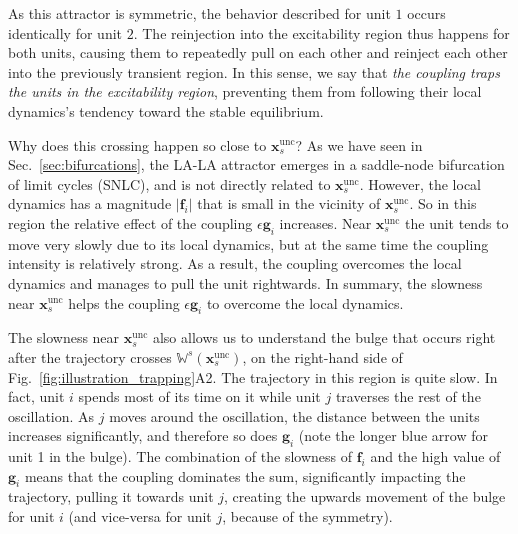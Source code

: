 As this attractor is symmetric, the behavior described for unit $1$ occurs identically for unit $2$. The reinjection into the excitability region thus happens for both units, causing them to repeatedly pull on each other and reinject each other into the previously transient region. In this sense, we say that \textit{the coupling traps the units in the excitability region}, preventing them from following their local dynamics's tendency toward the stable equilibrium.

Why does this crossing happen so close to $\mathbf{x}_s^\mathrm{unc}$? As we have seen in Sec.~\ref{sec:bifurcations}, the LA-LA attractor emerges in a saddle-node bifurcation of limit cycles (SNLC), and is not directly related to $\mathbf{x}_s^\mathrm{unc}$. However, the local dynamics has a magnitude $|\mathbf{f}_i|$ that is small in the vicinity of $\mathbf{x}_s^\mathrm{unc}$. So in this region the relative effect of the coupling $\epsilon \mathbf{g}_i$ increases. Near $\mathbf{x}_s^\mathrm{unc}$ the unit tends to move very slowly due to its local dynamics, but at the same time the coupling intensity is relatively strong. As a result, the coupling overcomes the local dynamics and manages to pull the unit rightwards. In summary, the slowness near $\mathbf{x}_s^\mathrm{unc}$ helps the coupling $\epsilon \mathbf{g}_i$ to overcome the local dynamics. %

The slowness near $\mathbf{x}_s^\mathrm{unc}$ also allows us to understand the bulge that occurs right after the trajectory crosses $\mathbb{W}^s(\mathbf{x}_s^\mathrm{unc})$, on the right-hand side of Fig.~\ref{fig:illustration_trapping}A2. The trajectory in this region is quite slow. In fact, unit $i$ spends most of its time on it while unit $j$ traverses the rest of the oscillation. As $j$ moves around the oscillation, the distance between the units increases significantly, and therefore so does $\mathbf{g}_i$ (note the longer blue arrow for unit 1 in the bulge). The combination of the slowness of $\mathbf{f}_i$ and the high value of $\mathbf{g}_i$ means that the coupling dominates the sum, significantly impacting the trajectory, pulling it towards unit $j$, creating the upwards movement of the bulge for unit $i$ (and vice-versa for unit $j$, because of the symmetry). 

